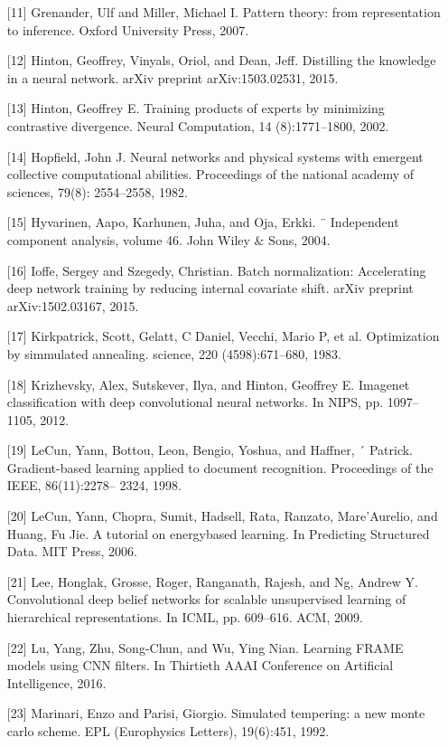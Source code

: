 \begin{itemize}
\item [{[}11{]}] Grenander, Ulf and Miller, Michael I. Pattern theory: from representation to inference. Oxford University Press, 2007.
\item [{[}12{]}] Hinton, Geoffrey, Vinyals, Oriol, and Dean, Jeff. Distilling the knowledge in a neural network. arXiv preprint arXiv:1503.02531, 2015.
\item [{[}13{]}] Hinton, Geoffrey E. Training products of experts by minimizing contrastive divergence. Neural Computation, 14 (8):1771–1800, 2002.
\item [{[}14{]}] Hopfield, John J. Neural networks and physical systems with emergent collective computational abilities. Proceedings of the national academy of sciences, 79(8): 2554–2558, 1982.
\item [{[}15{]}] Hyvarinen, Aapo, Karhunen, Juha, and Oja, Erkki. ¨ Independent component analysis, volume 46. John Wiley \& Sons, 2004.
\item [{[}16{]}] Ioffe, Sergey and Szegedy, Christian. Batch normalization: Accelerating deep network training by reducing internal covariate shift. arXiv preprint arXiv:1502.03167, 2015.
\item [{[}17{]}] Kirkpatrick, Scott, Gelatt, C Daniel, Vecchi, Mario P, et al. Optimization by simmulated annealing. science, 220 (4598):671–680, 1983.
\item [{[}18{]}] Krizhevsky, Alex, Sutskever, Ilya, and Hinton, Geoffrey E. Imagenet classification with deep convolutional neural networks. In NIPS, pp. 1097–1105, 2012.
\item [{[}19{]}] LeCun, Yann, Bottou, Leon, Bengio, Yoshua, and Haffner, ´ Patrick. Gradient-based learning applied to document recognition. Proceedings of the IEEE, 86(11):2278– 2324, 1998.
\item [{[}20{]}] LeCun, Yann, Chopra, Sumit, Hadsell, Rata, Ranzato, Mare’Aurelio, and Huang, Fu Jie. A tutorial on energybased learning. In Predicting Structured Data. MIT Press, 2006.
\item [{[}21{]}] Lee, Honglak, Grosse, Roger, Ranganath, Rajesh, and Ng, Andrew Y. Convolutional deep belief networks for scalable unsupervised learning of hierarchical representations. In ICML, pp. 609–616. ACM, 2009.
\item [{[}22{]}] Lu, Yang, Zhu, Song-Chun, and Wu, Ying Nian. Learning FRAME models using CNN filters. In Thirtieth AAAI Conference on Artificial Intelligence, 2016.
\item [{[}23{]}] Marinari, Enzo and Parisi, Giorgio. Simulated tempering: a new monte carlo scheme. EPL (Europhysics Letters), 19(6):451, 1992.

\end{itemize}
